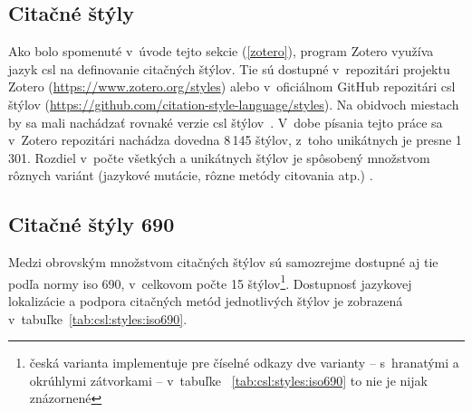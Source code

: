 \documentclass[
  color,
  table,
  nolof,
  oneside,
]{fithesis3}
\begin{document}

\subsection{Citačné štýly}

Ako bolo spomenuté v~úvode tejto sekcie (\ref{zotero}), program Zotero využíva jazyk \gls{csl} na definovanie citačných štýlov. Tie sú dostupné v~repozitári projektu Zotero (\url{https://www.zotero.org/styles}) alebo v~oficiálnom GitHub repozitári \gls{csl} štýlov (\url{https://github.com/citation-style-language/styles}). Na obidvoch miestach by sa mali nachádzať rovnaké verzie \gls{csl} štýlov~\cite{csl:styles}. V~dobe písania tejto práce sa v~Zotero repozitári nachádza dovedna 8\,145 štýlov, z~toho unikátnych je presne 1\,301. Rozdiel v~počte všetkých a unikátnych štýlov je spôsobený množstvom rôznych variánt (jazykové mutácie, rôzne metódy citovania atp.) .

\subsection{Citačné štýly  690}

Medzi obrovským množstvom citačných štýlov sú samozrejme dostupné aj tie podľa normy \gls{iso} 690, v~celkovom počte 15 štýlov\footnote{česká varianta implementuje pre číselné odkazy dve varianty -- s~hranatými a okrúhlymi zátvorkami -- v~tabuľke ~\ref{tab:csl:styles:iso690} to nie je nijak znázornené}. Dostupnosť jazykovej lokalizácie a podpora citačných metód jednotlivých štýlov je zobrazená v~tabuľke~\ref{tab:csl:styles:iso690}.
\end{document}
